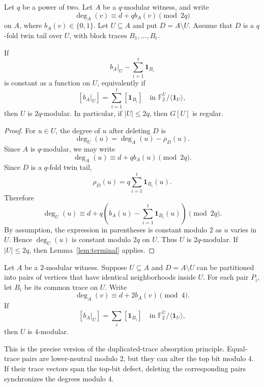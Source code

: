 \documentclass[thmsec,dntnbr,nolinenbrs]{dmgt}
\numberwithin{equation}{section}
\newcommand{\F}{\mathbb{F}}
\newcommand{\one}{\mathbf{1}}
\begin{document}
\begin{theorem}\label{thm:twin-tail}
Let \(q\) be a power of two.  Let \(A\) be a \(q\)-modular witness, and write
\[
        \deg_A(v)\equiv d+qb_A(v)\pmod{2q}
\]
on \(A\), where \(b_A(v)\in\{0,1\}\).  Let \(U\subseteq A\) and put \(D=A\setminus U\).  Assume that \(D\) is a \(q\)-fold twin tail over \(U\), with block traces \(B_1,\ldots,B_t\).

If
\[
        b_A|_U-\sum_{i=1}^t \one_{B_i}
\]
is constant as a function on \(U\), equivalently if
\[
        [b_A|_U]=\sum_{i=1}^t[\one_{B_i}]
        \quad\text{in }\F_2^U/\langle \one_U\rangle,
\]
then \(U\) is \(2q\)-modular.  In particular, if \(|U|\le 2q\), then \(G[U]\) is regular.
\end{theorem}

\begin{proof}
For \(u\in U\), the degree of \(u\) after deleting \(D\) is
\[
        \deg_U(u)=\deg_A(u)-\rho_D(u).
\]
Since \(A\) is \(q\)-modular, we may write
\[
        \deg_A(u)\equiv d+qb_A(u)\pmod{2q}.
\]
Since \(D\) is a \(q\)-fold twin tail,
\[
        \rho_D(u)=q\sum_{i=1}^t \one_{B_i}(u).
\]
Therefore
\[
        \deg_U(u)\equiv
        d+q\left(b_A(u)-\sum_{i=1}^t\one_{B_i}(u)\right)
        \pmod{2q}.
\]
By assumption, the expression in parentheses is constant modulo \(2\) as \(u\) varies in \(U\).  Hence \(\deg_U(u)\) is constant modulo \(2q\) on \(U\).  Thus \(U\) is \(2q\)-modular.  If \(|U|\le 2q\), then Lemma~\ref{lem:terminal} applies.
\end{proof}

\begin{corollary}\label{cor:first-bit-pair}
Let \(A\) be a \(2\)-modular witness.  Suppose \(U\subseteq A\) and \(D=A\setminus U\) can be partitioned into pairs of vertices that have identical neighborhoods inside \(U\).  For each pair \(P_i\), let \(B_i\) be its common trace on \(U\).  Write
\[
        \deg_A(v)\equiv d+2b_A(v)\pmod 4.
\]
If
\[
        [b_A|_U]=\sum_i[\one_{B_i}]
        \quad\text{in }\F_2^U/\langle \one_U\rangle,
\]
then \(U\) is \(4\)-modular.
\end{corollary}

This is the precise version of the duplicated-trace absorption principle.  Equal-trace pairs are lower-neutral modulo \(2\), but they can alter the top bit modulo \(4\).  If their trace vectors span the top-bit defect, deleting the corresponding pairs synchronizes the degrees modulo \(4\).
\end{document}
